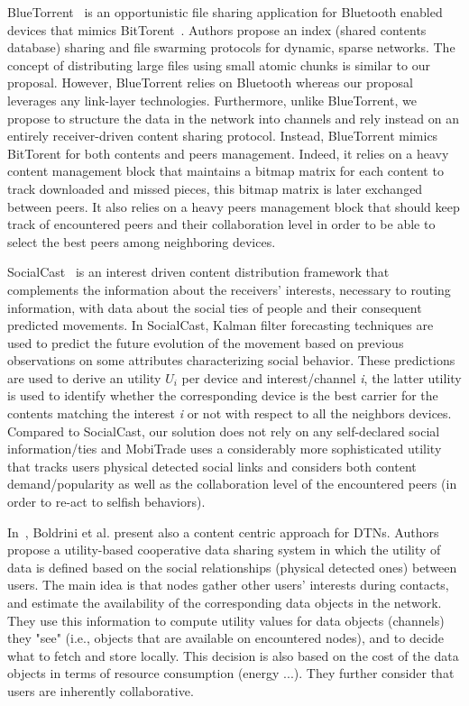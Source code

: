 BlueTorrent~\cite{BlueTorrent} is an opportunistic file sharing application for Bluetooth enabled devices that mimics BitTorent~\cite{RefBT}. Authors propose an index (shared contents database) sharing and file swarming protocols for dynamic, sparse networks. The concept of distributing large files using small atomic chunks is similar to our proposal. However, BlueTorrent relies on Bluetooth whereas our proposal leverages any link-layer technologies. Furthermore, unlike BlueTorrent, we propose to structure the data in the network into channels and rely instead on an entirely receiver-driven content sharing protocol. Instead, BlueTorrent mimics BitTorent for both contents and peers management. Indeed, it relies on a heavy content management block that maintains a bitmap matrix for each content to track downloaded and missed pieces, this bitmap matrix is later exchanged between peers. It also relies on a heavy peers management block that should keep track of encountered peers and their collaboration level in order to be able to select the best peers among neighboring devices.

SocialCast~\cite{SocialCast2, SocialCast} is an interest driven content distribution framework that complements the information about the receivers' interests, necessary to routing information, with data about the social ties of people and their consequent predicted movements. In SocialCast, Kalman filter forecasting techniques are used to predict the future evolution of the movement based on previous observations on some attributes characterizing social behavior. These predictions are used to derive an utility $U_i$ per device and interest/channel \emph{i}, the latter utility is used to identify whether the corresponding device is the best carrier for the contents matching the interest \emph{i} or not with respect to all the neighbors devices. Compared to SocialCast, our solution does not rely on any self-declared social information/ties and MobiTrade uses a considerably more sophisticated utility that tracks users physical detected social links and considers both content demand/popularity as well as the collaboration level of the encountered peers (in order to re-act to selfish behaviors).

In~\cite{Boldrini:2008:MDD}, Boldrini et al. present also a content centric approach for DTNs. Authors propose a utility-based cooperative data sharing system in which the utility of data is defined based on the social
relationships (physical detected ones) between users.  The main idea is that nodes gather other users' interests during contacts, and estimate the availability of the corresponding data objects in the network. They use this information to compute utility values for data objects (channels) they "see" (i.e., objects that are available on encountered nodes), and to decide what to fetch and store locally. This decision is also based on the cost of the data objects in terms of resource consumption (energy ...). They further consider that users are inherently collaborative.

